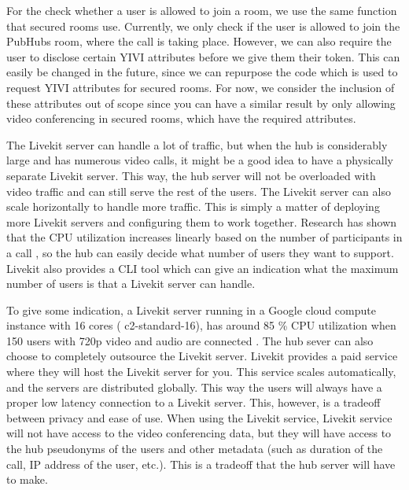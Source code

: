 \documentclass{report}
\begin{document}
For the check whether a user is allowed to join a room, we use the same function that secured rooms use. Currently,
we only check if the user is allowed to join the PubHubs room, where the call is taking place. However, we can also
require the user to disclose certain YIVI attributes before we give them their token. This can easily be changed in the
future, since we can repurpose the code which is used to request YIVI attributes for secured rooms. For now, we consider
the inclusion of these attributes out of scope since you can have a similar result by only allowing video conferencing
in secured rooms, which have the required attributes.


The Livekit server can handle a lot of traffic, but when the hub is considerably large and has numerous video calls, it
might be a good idea to have a physically separate Livekit server. This way, the hub server will not be overloaded with
video traffic and can still serve the rest of the users. The Livekit server can also scale horizontally to handle
more traffic. This is simply a matter of deploying more Livekit servers and configuring them to work together.
Research has shown that the CPU utilization increases linearly based on the number of participants in a call
\cite{muscariello_securing_2023}, so the hub can easily decide what number of users they want to
support. Livekit also provides a CLI tool which can give an indication what the maximum number of users is that a
Livekit server can handle.


To give some indication, a Livekit server running in a Google cloud compute instance with 16 cores (
c2-standard-16), has around 85 \% CPU utilization when 150 users with 720p video and audio are connected
\cite{noauthor_benchmarking_nodate}. The hub sever can also choose to completely outsource the Livekit server.
Livekit provides a paid service where they will host the Livekit server for you. This service scales
automatically, and the servers are distributed globally. This way the users will always have a proper low
latency connection to a Livekit server. This, however, is a tradeoff between privacy and ease of use. When using
the Livekit service, Livekit service will not have access to the video conferencing data, but they will have access to
the hub pseudonyms of the users and other metadata (such as duration of the call, IP address of the user, etc.). This
is a tradeoff that the hub server will have to make.
\end{document}
